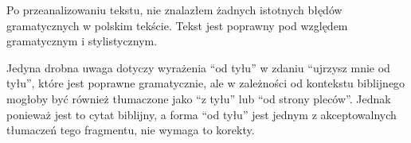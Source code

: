 Po przeanalizowaniu tekstu, nie znalazłem żadnych istotnych błędów gramatycznych w polskim tekście. Tekst jest poprawny pod względem gramatycznym i stylistycznym.

Jedyna drobna uwaga dotyczy wyrażenia “od tyłu” w zdaniu “ujrzysz mnie od tyłu”, które jest poprawne gramatycznie, ale w zależności od kontekstu biblijnego mogłoby być również tłumaczone jako “z tyłu” lub “od strony pleców”. Jednak ponieważ jest to cytat biblijny, a forma “od tyłu” jest jednym z akceptowalnych tłumaczeń tego fragmentu, nie wymaga to korekty.